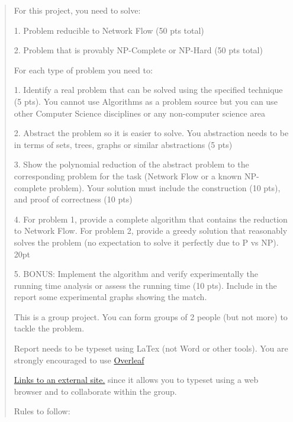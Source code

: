 \begin{quote}\small\raggedright

For this project, you need to solve:\par

1. Problem reducible to Network Flow (50 pts total)\par
2. Problem that is provably NP-Complete or NP-Hard (50 pts total)\par

For each type of problem you need to:\par

1. Identify a real problem that can be solved using the specified technique (5 pts). You cannot use Algorithms as a problem source but you can use other Computer Science disciplines or any non-computer science area\par
2. Abstract the problem so it is easier to solve. You abstraction needs to be in terms of sets, trees, graphs or similar abstractions (5 pts)\par
3. Show the polynomial reduction of  the abstract problem to the corresponding problem for the task (Network Flow or a known NP-complete problem). Your solution must include the construction (10 pts), and proof of correctness (10 pts)\par
4. For problem 1, provide a complete algorithm that contains the reduction to Network Flow. For problem 2, provide a greedy solution that reasonably solves the problem (no expectation to solve it perfectly due to P vs NP). 20pt\par
5. BONUS: Implement the algorithm and verify experimentally the running time analysis or assess the running time (10 pts). Include in the report some experimental graphs showing the match.\par

This is a group project. You can form groups of 2 people (but not more) to tackle the problem.\par

Report needs to be typeset using LaTex (not Word or other tools). You are strongly encouraged to use \href{https://www.overleaf.com/}{Overleaf}\par

\href{https://www.overleaf.com/}{Links to an external site.} since it allows you to typeset using a web browser and to collaborate within the group.\par

Rules to follow: \par


\end{quote}
